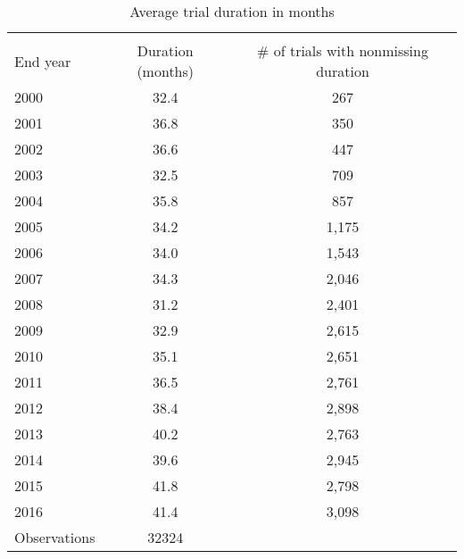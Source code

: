 \begin{table}[htbp]\centering
\caption{Average trial duration in months}
\begin{tabular}{l*{1}{cc}}
\hline\hline
                    &\multicolumn{2}{c}{}     \\
End year            &Duration (months)&\# of trials with nonmissing duration\\
\hline
2000                &        32.4&         267\\
2001                &        36.8&         350\\
2002                &        36.6&         447\\
2003                &        32.5&         709\\
2004                &        35.8&         857\\
2005                &        34.2&       1,175\\
2006                &        34.0&       1,543\\
2007                &        34.3&       2,046\\
2008                &        31.2&       2,401\\
2009                &        32.9&       2,615\\
2010                &        35.1&       2,651\\
2011                &        36.5&       2,761\\
2012                &        38.4&       2,898\\
2013                &        40.2&       2,763\\
2014                &        39.6&       2,945\\
2015                &        41.8&       2,798\\
2016                &        41.4&       3,098\\
\hline
Observations        &       32324&            \\
\hline\hline
\end{tabular}
\end{table}
